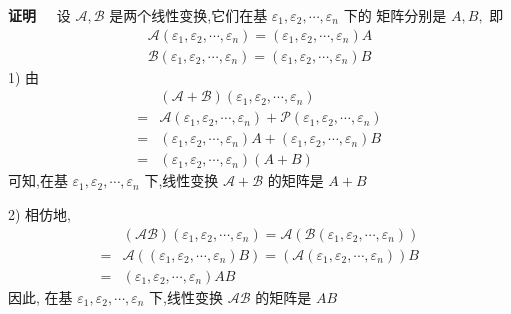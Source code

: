 \documentclass[13pt]{beamer}
\def\pf{{\bf 证明~~ }}
\begin{document}
\begin{frame}
	\pf 设 $\mathscr{A}, \mathscr{B}$ 是两个线性变换,它们在基 ${\varepsilon}_{1}, {\varepsilon}_{2}, \cdots, {\varepsilon}_{n}$ 下的
	矩阵分别是 ${A}, {B},$ 即
	\[
	\begin{array}{l}
	\mathscr{A}\left({\varepsilon}_{1}, {\varepsilon}_{2}, \cdots, {\varepsilon}_{n}\right)=\left({\varepsilon}_{1}, {\varepsilon}_{2}, \cdots, {\varepsilon}_{n}\right) {A} \\
	\mathscr{B}\left({\varepsilon}_{1}, {\varepsilon}_{2}, \cdots, {\varepsilon}_{n}\right)=\left({\varepsilon}_{1}, {\varepsilon}_{2}, \cdots, {\varepsilon}_{n}\right) {B}
	\end{array}
	\]
	1) 由
	\[
	\begin{aligned}
	&(\mathscr{A}+\mathscr{B})\left({\varepsilon}_{1}, {\varepsilon}_{2}, \cdots, {\varepsilon}_{n}\right) \\
	=& \mathscr{A}\left({\varepsilon}_{1}, {\varepsilon}_{2}, \cdots, {\varepsilon}_{n}\right)+\mathscr{P}\left({\varepsilon}_{1}, {\varepsilon}_{2}, \cdots, {\varepsilon}_{n}\right) \\
	=&\left({\varepsilon}_{1}, {\varepsilon}_{2}, \cdots, {\varepsilon}_{n}\right) {A}+\left({\varepsilon}_{1}, {\varepsilon}_{2}, \cdots, {\varepsilon}_{n}\right) {B} \\
	=&\left({\varepsilon}_{1}, {\varepsilon}_{2}, \cdots, {\varepsilon}_{n}\right)({A}+{B})
	\end{aligned}
	\]
	可知,在基 ${\varepsilon}_{1}, {\varepsilon}_{2}, \cdots, {\varepsilon}_{n}$ 下,线性变换 $\mathscr{A}+\mathscr{B}$ 的矩阵是 ${A}+{B}$
	
	2) 相仿地, 
	\[
	\begin{aligned}
	&(\mathscr{A} \mathscr{B})\left({\varepsilon}_{1}, {\varepsilon}_{2}, \cdots, {\varepsilon}_{n}\right)=\mathscr{A}\left(\mathscr{B}\left({\varepsilon}_{1}, {\varepsilon}_{2}, \cdots, {\varepsilon}_{n}\right)\right) \\
	=& \mathscr{A}\left(\left({\varepsilon}_{1}, {\varepsilon}_{2}, \cdots, {\varepsilon}_{n}\right) {B}\right)=\left(\mathscr{A}\left({\varepsilon}_{1}, {\varepsilon}_{2}, \cdots, {\varepsilon}_{n}\right)\right) {B} \\
	=&\left({\varepsilon}_{1}, {\varepsilon}_{2}, \cdots, {\varepsilon}_{n}\right) {A} {B}
	\end{aligned}
	\]
	因此, 在基 ${\varepsilon}_{1}, {\varepsilon}_{2}, \cdots, {\varepsilon}_{n}$ 下,线性变换 $\mathscr{A B}$ 的矩阵是 ${A} {B}$
\end{frame}
\end{document}
